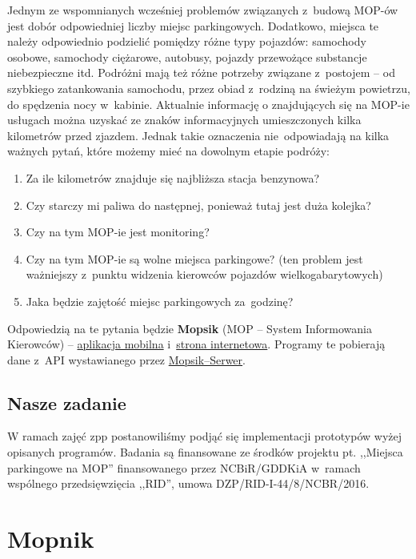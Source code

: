 Jednym ze wspomnianych wcześniej problemów związanych z~budową MOP-ów jest dobór odpowiedniej liczby miejsc parkingowych. Dodatkowo, miejsca te należy odpowiednio podzielić pomiędzy różne typy pojazdów: samochody osobowe, samochody ciężarowe, autobusy, pojazdy przewożące substancje niebezpieczne itd. Podróżni mają też różne potrzeby związane z~postojem -- od szybkiego zatankowania samochodu, przez obiad z~rodziną na świeżym powietrzu, do spędzenia nocy w~kabinie. \newline Aktualnie informację o znajdujących się na MOP-ie usługach można uzyskać ze znaków informacyjnych umieszczonych kilka kilometrów przed zjazdem. Jednak takie oznaczenia nie~odpowiadają na kilka ważnych pytań, które możemy mieć na dowolnym etapie podróży:
\begin{enumerate}
	\item Za ile kilometrów znajduje się najbliższa stacja benzynowa? 
	\item Czy starczy mi paliwa do następnej, ponieważ tutaj jest duża kolejka?
	\item Czy na tym MOP-ie jest monitoring?
	\item Czy na tym MOP-ie są wolne miejsca parkingowe? (ten problem jest ważniejszy z~punktu widzenia kierowców pojazdów wielkogabarytowych)
	\item Jaka będzie zajętość miejsc parkingowych za~godzinę?
\end{enumerate}

Odpowiedzią na te pytania będzie \textbf{Mopsik} (MOP -- System Informowania Kierowców) -- \hyperref[mopsik_mobile]{aplikacja mobilna} i~\hyperref[mopsik_web]{strona internetowa}. Programy te pobierają dane z~API wystawianego przez \hyperref[mopsik_api]{Mopsik--Serwer}.


\section{Nasze zadanie}
W ramach zajęć \acrshort{zpp} postanowiliśmy podjąć się implementacji prototypów wyżej opisanych programów.
Badania są finansowane ze środków projektu pt. ,,Miejsca parkingowe na MOP'' finansowanego przez NCBiR/GDDKiA w~ramach wspólnego przedsięwzięcia ,,RID'', umowa DZP/RID-I-44/8/NCBR/2016.
\chapter{Mopnik}\label{r:Mopnik}
\label{r:mopnik}
